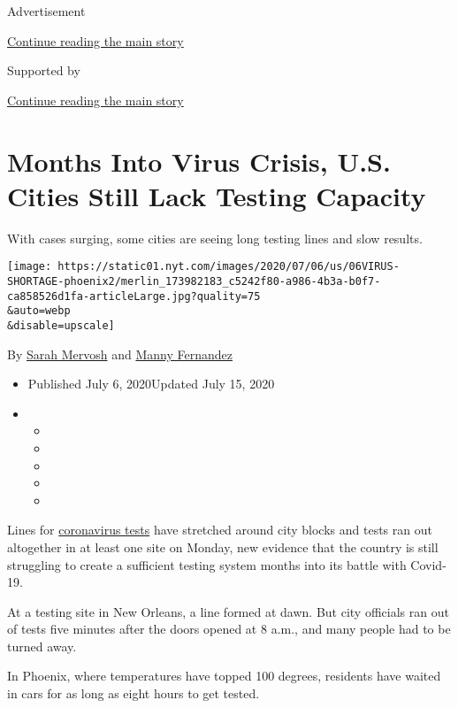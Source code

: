 Advertisement

\protect\hyperlink{after-top}{Continue reading the main story}

Supported by

\protect\hyperlink{after-sponsor}{Continue reading the main story}

\hypertarget{months-into-virus-crisis-us-cities-still-lack-testing-capacity}{%
\section{Months Into Virus Crisis, U.S. Cities Still Lack Testing
Capacity}\label{months-into-virus-crisis-us-cities-still-lack-testing-capacity}}

With cases surging, some cities are seeing long testing lines and slow
results.

\texttt{[image: https://static01.nyt.com/images/2020/07/06/us/06VIRUS-SHORTAGE-phoenix2/merlin\_173982183\_c5242f80-a986-4b3a-b0f7-ca858526d1fa-articleLarge.jpg?quality=75\\\&auto=webp\\\&disable=upscale]}

By \href{https://www.nytimes.com/by/sarah-mervosh}{Sarah Mervosh} and
\href{https://www.nytimes.com/by/manny-fernandez}{Manny Fernandez}

\begin{itemize}
\item
  Published July 6, 2020Updated July 15, 2020
\item
  \begin{itemize}
  \item
  \item
  \item
  \item
  \item
  \end{itemize}
\end{itemize}

Lines for
\href{https://www.nytimes.com/2020/07/15/parenting/kids-covid-19-test.html}{coronavirus
tests} have stretched around city blocks and tests ran out altogether in
at least one site on Monday, new evidence that the country is still
struggling to create a sufficient testing system months into its battle
with Covid-19.

At a testing site in New Orleans, a line formed at dawn. But city
officials ran out of tests five minutes after the doors opened at 8
a.m., and many people had to be turned away.

In Phoenix, where temperatures have topped 100 degrees, residents have
waited in cars for as long as eight hours to get tested.


